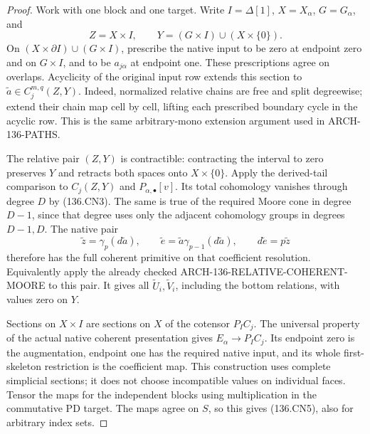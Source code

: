 \begin{proof}
Work with one block and one target.  Write \(I=\Delta[1]\),
\(X=X_\alpha\), \(G=G_\alpha\), and
\[
 Z=X\times I,\qquad Y=(G\times I)\cup(X\times\{0\}).
                                                               \tag{136.CN6}
\]
On \((X\times\partial I)\cup(G\times I)\), prescribe
the native input to be zero at endpoint zero and on \(G\times I\),
and to be \(a_{j\alpha}\) at endpoint one.  These prescriptions
agree on overlaps.  Acyclicity of the original input row extends
this section to \(\widetilde a\in C_j^{m,q}(Z,Y)\).
Indeed, normalized relative chains are free and split degreewise;
extend their chain map cell by cell, lifting each prescribed
boundary cycle in the acyclic row.  This is the same arbitrary-mono
extension argument used in ARCH-136-PATHS.

The relative pair \((Z,Y)\) is contractible: contracting the
interval to zero preserves \(Y\) and retracts both spaces onto
\(X\times\{0\}\).  Apply the derived-tail comparison
to \(C_j(Z,Y)\) and \(P_{\alpha,\bullet}[v]\).
Its total cohomology vanishes through degree \(D\) by (136.CN3).
The same is true of the required Moore cone in degree \(D-1\),
since that degree uses only the adjacent cohomology groups in
degrees \(D-1,D\).  The native pair
\[
 \widetilde z=\gamma_p(d\widetilde a),\qquad
 \widetilde e=\widetilde a\gamma_{p-1}(d\widetilde a),
 \qquad d\widetilde e=p\widetilde z
\]
therefore has the full coherent primitive on that coefficient
resolution.  Equivalently apply the already checked
ARCH-136-RELATIVE-COHERENT-MOORE to this pair.  It gives all
\(\widetilde U_i,\widetilde V_i\), including the bottom
relations, with values zero on \(Y\).

Sections on \(X\times I\) are sections on \(X\) of
the cotensor \(P_I C_j\).  The universal property of the
actual native coherent presentation gives
\(E_\alpha\to P_I C_j\).  Its endpoint zero is the
augmentation, endpoint one has the required native input, and
its whole first-skeleton restriction is the coefficient map.
This construction uses complete simplicial sections; it does
not choose incompatible values on individual faces.  Tensor
the maps for the independent blocks using multiplication in
the commutative PD target.  The maps agree on \(S\), so
this gives (136.CN5), also for arbitrary index sets.


\end{proof}
